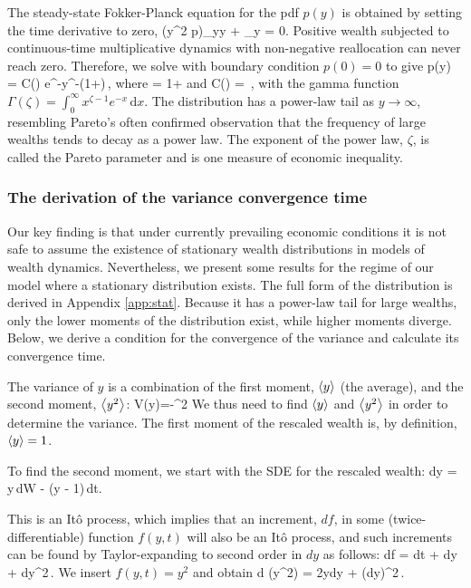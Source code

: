 The steady-state Fokker-Planck equation for the pdf $p\left(y\right)$ is obtained by setting the time derivative to zero,
\be
{}\left(y^2 p\right)_{yy} + \tau{}_y = 0.
\ee
Positive wealth subjected to continuous-time multiplicative dynamics with non-negative reallocation can never reach zero. Therefore, we solve  with boundary condition $p\left(0\right)=0$ to give
\be
p\left(y\right) = C\left(\zeta\right) e^{-}y^{-\left(1+\zeta\right)}\,,
\ee
where 
\be
\zeta = 1+
\ee
and
\be
C\left(\zeta\right) = \frac{\left(\zeta -1\right)^\zeta}{\Gamma \left(\zeta \right)}\,,
\ee
with the gamma function $\Gamma\left(\zeta\right) = \int_0^\infty x^{\zeta-1} e^{-x}\,\mathrm{d}x$. The distribution has a power-law tail as $y\to\infty$, resembling Pareto's often confirmed observation that the frequency of large wealths tends to decay as a power law. The exponent of the power law, $\zeta$, is called the Pareto parameter and is one measure of economic inequality.

\subsubsection{The derivation of the variance convergence time}\label{app:var_conv}

Our key finding is that under currently prevailing economic conditions it is not safe to assume the existence of stationary wealth distributions in models of wealth dynamics. 
Nevertheless, we present some results for the regime of our model where a stationary distribution exists.
The full form of the distribution is derived in Appendix \ref{app:stat}. Because it has a power-law tail for large wealths, only the lower moments of the distribution exist, while higher moments diverge.
Below, we derive a condition for the convergence of the variance and calculate its convergence time.

The variance of $y$ is a combination of the first moment, $\left\langle y \right\rangle$ (the average), and the second moment, $\left\langle y^2 \right\rangle$:
\be
V\left(y\right)=-^2
\ee
We thus need to find $\left\langle y \right\rangle$ and $\left\langle y^2 \right\rangle$ in order to determine the variance. 
The first moment of the rescaled wealth is, by definition, $\left\langle y \right\rangle=1$. 

To find the second moment, we start with the SDE for the rescaled wealth:
\be
dy = \sigma y\,dW - \tau\left(y - 1\right)\,dt.
\ee

This is an It\^o process, which implies that an increment, $df$, in some (twice-differentiable) function $f\left(y,t\right)$ will also be an It\^o process, and such increments can be found by Taylor-expanding to second order in $dy$ as follows:
\be
df =  dt +  dy +  dy^2\,.
\ee
We insert $f\left(y,t\right)=y^2$ and obtain
\be
d \left(y^2\right) = 2ydy + \left(dy\right)^2\,.
\ee

